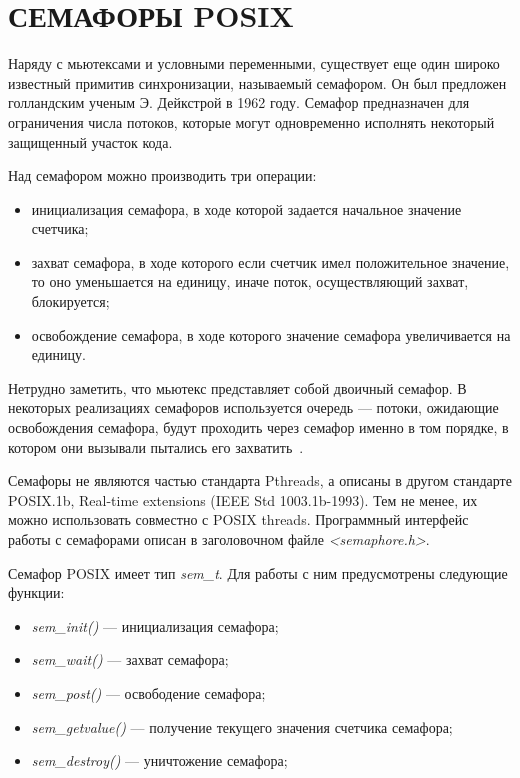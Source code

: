 \section[Семафоры POSIX]{СЕМАФОРЫ POSIX}

Наряду с мьютексами и условными переменными,
существует еще один широко известный примитив синхронизации,
называемый семафором.
Он был предложен голландским ученым Э. Дейкстрой в 1962 году.
Семафор предназначен для ограничения числа потоков,
которые могут одновременно исполнять некоторый защищенный участок кода.

Над семафором можно производить три операции:
\begin{itemize}
  \item инициализация семафора, в ходе которой задается начальное значение счетчика;
  \item захват семафора, в ходе которого если счетчик имел положительное
    значение, то оно уменьшается на единицу, иначе поток, осуществляющий захват, блокируется;
  \item освобождение семафора, в ходе которого значение семафора увеличивается на единицу.
\end{itemize}

Нетрудно заметить, что мьютекс представляет собой двоичный семафор.
В некоторых реализациях семафоров используется очередь --- потоки,
ожидающие освобождения семафора, будут проходить через семафор
именно в том порядке, в котором они вызывали пытались его захватить~\cite{wiki_semaphore}.

Семафоры не являются частью стандарта Pthreads, а описаны в другом стандарте
POSIX.1b, Real-time extensions (IEEE Std 1003.1b-1993).
Тем не менее, их можно использовать совместно с POSIX threads.
Программный интерфейс работы с семафорами описан в заголовочном файле \textit{<semaphore.h>}.

Семафор POSIX имеет тип \textit{sem\_t}. Для работы с ним предусмотрены следующие функции:
\begin{itemize}
\item \textit{sem\_init()} --- инициализация семафора;
\item \textit{sem\_wait()} --- захват семафора;
\item \textit{sem\_post()} --- освободение семафора;
\item \textit{sem\_getvalue()} --- получение текущего значения счетчика семафора;
\item \textit{sem\_destroy()} --- уничтожение семафора;
\end{itemize}

